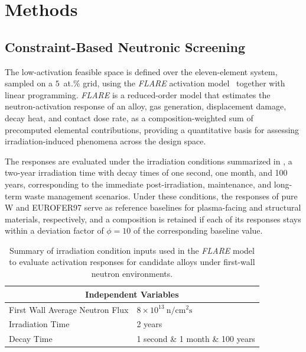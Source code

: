 \section{Methods}
\subsection{Constraint-Based Neutronic Screening}
\label{sec:feasible-space}

The low-activation feasible space is defined over the eleven-element
 system, sampled on a \(5\)~at.\% grid, using
the \emph{FLARE} activation model~\cite{Marquez2026FLARE} together with linear programming.
\emph{FLARE} is a reduced-order model that estimates the neutron-activation
response of an alloy, gas generation, displacement damage, decay heat, and contact
dose rate, as a composition-weighted sum of precomputed elemental contributions,
providing a quantitative basis for assessing irradiation-induced phenomena across
the design space.

The responses are evaluated under the irradiation conditions summarized in
, a two-year irradiation time with decay times of one
second, one month, and 100 years, corresponding to the immediate post-irradiation,
maintenance, and long-term waste management scenarios. Under these conditions, the
responses of pure W and EUROFER97 serve as reference baselines for plasma-facing
and structural materials, respectively, and a composition is retained if each of
its responses stays within a deviation factor of \(\phi=10\) of the corresponding
baseline value.

\begin{table}[H]
\centering
\caption{Summary of irradiation condition inputs used in the \emph{FLARE} model to
evaluate activation responses for candidate alloys under first-wall neutron
environments.}
\label{tab:ind_variables}
\begin{tabularx}{\columnwidth}{lX}
\toprule
\multicolumn{2}{c}{\textbf{Independent Variables}} \\
\midrule
First Wall Average Neutron Flux & \(8\times10^{13}~\mathrm{n/cm^2 s}\) \\
Irradiation Time               & 2 years \\
Decay Time                     & 1 second \& 1 month \& 100 years \\
\bottomrule
\end{tabularx}
\end{table}

